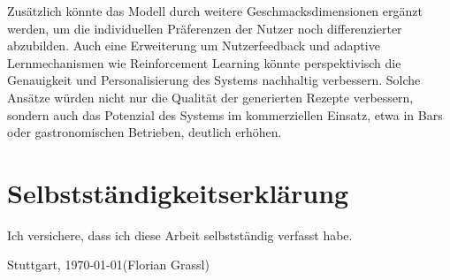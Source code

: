 \documentclass[12pt, a4paper]{report}
\begin{document}
Zusätzlich könnte das Modell durch weitere Geschmacksdimensionen ergänzt werden, um die individuellen Präferenzen der Nutzer noch differenzierter abzubilden. Auch eine Erweiterung um Nutzerfeedback und adaptive Lernmechanismen wie Reinforcement Learning könnte perspektivisch die Genauigkeit und Personalisierung des Systems nachhaltig verbessern. Solche Ansätze würden nicht nur die Qualität der generierten Rezepte verbessern, sondern auch das Potenzial des Systems im kommerziellen Einsatz, etwa in Bars oder gastronomischen Betrieben, deutlich erhöhen.

\chapter*{Selbstständigkeitserklärung}
Ich versichere, dass ich diese Arbeit selbstständig verfasst habe.

Stuttgart, \today \hfill (Florian Grassl)
\end{document}

